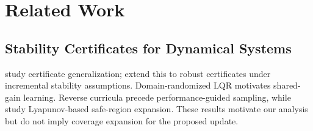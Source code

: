 \section{Related Work}
\label{sec:related_work}

\subsection{Stability Certificates for Dynamical Systems}
\label{subsec:stability_certificate_methods}
\citet{boffi2021learning} study certificate generalization;
\citet{zhang2022adversarially} extend this to robust certificates under incremental
stability assumptions. Domain-randomized LQR \citep{fujinami2025domain}
motivates shared-gain learning. Reverse curricula \citep{florensa2017reverse}
precede performance-guided sampling, while \citet{berkenkamp2017safe} study
Lyapunov-based safe-region expansion. These results motivate our analysis but
do not imply coverage expansion for the proposed update. 
